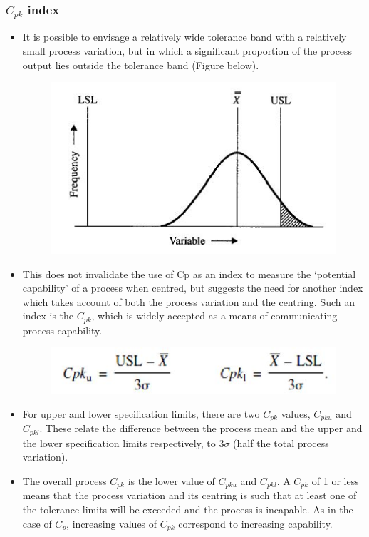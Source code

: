 \documentclass[11pt]{article} %
\begin{document}
\newpage	
	\subsubsection*{$C_{pk}$ index}
\begin{itemize}
\item It is possible to envisage a relatively wide tolerance band with a relatively
	small process variation, but in which a significant proportion of the process output lies outside the tolerance band (Figure below). 
	
	\begin{figure}[h!]
		\centering
		\includegraphics[width=0.7\linewidth]{proccapindices/image3}
	\end{figure}
	
\item This does not invalidate the use of Cp as an index to measure the ‘potential capability’ of a process when centred, but suggests the need for another index which takes account of both the process variation and the centring. Such an index is the $C_{pk}$, which is widely accepted as a means of communicating process capability.
	
	\begin{figure}[h!]
		\centering
		\includegraphics[width=0.7\linewidth]{proccapindices/image4}
	\end{figure}
	
\item 	For upper and lower specification limits, there are two $C_{pk}$ values,
	$C_{pku}$ and $C_{pkl}$. These relate the difference between the process mean and the upper and the lower specification limits respectively, to $3\sigma$ (half the total process variation).
	
\item	The overall process $C_{pk}$ is the lower value of $C_{pku}$ and $C_{pkl}$. A $C_{pk}$ of 1 or less means that the process variation and its centring is such that at least one of the tolerance limits will be exceeded and the process is incapable. As in the case of $C_p$, increasing values of $C_{pk}$ correspond to increasing capability. 
	

\end{itemize}
\end{document}
